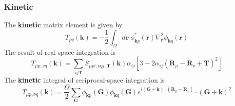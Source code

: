 \documentclass{article}
\begin{document}
        \subsubsection{Kinetic}
            The \textbf{kinetic} matrix element is given by
            \begin{equation}
                T_{pq}(\textbf{k}) = -\frac{1}{2}\int_{\Omega}d\textbf{r}\ \phi_{\textbf{k}p}^*(\textbf{r})\nabla_{\textbf{r}}^2
                \phi_{\textbf{k}q}(\textbf{r})
            \end{equation}
            The result of real-space integration is  
            \begin{equation}
                T_{\mu p,\nu q}(\textbf{k}) = \sum_{ij\textbf{T}}S_{\mu pi,\nu qj,\textbf{T}}(\textbf{k})
                \alpha_{ij}\left[3-2\alpha_{ij}(\textbf{R}_{\mu}-\textbf{R}_{\nu}+\textbf{T})^2\right]
            \end{equation}
            The \textbf{kinetic} integral of reciprocal-space integration is
            \begin{equation}
                T_{\mu p,\nu q}(\textbf{k}) = \frac{\Omega}{2}\sum_{\textbf{G}}\phi_{\textbf{k}p}(\textbf{G})\phi_{\textbf{k}q}(\textbf{G})
                e^{i(\textbf{G}+\textbf{k})\cdot(\textbf{R}_{\mu}-\textbf{R}_{\nu})}\cdot (\textbf{G}+\textbf{k})^2
            \end{equation}
\end{document}
